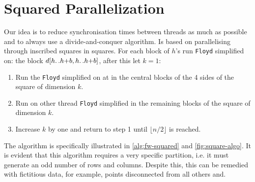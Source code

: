 \section{Squared Parallelization}\label{squared-parallelization}

Our idea is to reduce synchronisation times between threads as much as possible and to always use a divide-and-conquer algorithm. Is based on parallelising through inscribed squares in squares.
For each block of \(h\)'s run \texttt{Floyd} simplified on: the block \(d[h{\mathinner {\ldotp \ldotp}}h{+}b,h{\mathinner {\ldotp \ldotp}}h{+}b]\), after this let \(k=1\):
\begin{enumerate}
    \item Run the \texttt{Floyd} simplified on at in the central blocks of the 4 sides of the square of dimension \(k\).
    \item Run on other thread \texttt{Floyd} simplified in the remaining blocks of the square of dimension \(k\).
    \item Increase \(k\) by one and return to step 1 until \(\lfloor n/2 \rfloor\) is reached.
\end{enumerate}
The algorithm is specifically illustrated in \cref{alg:fw-squared} and \cref{fig:square-algo}.
It is evident that this algorithm requires a very specific partition, i.e. it must generate an odd number of rows and columns. Despite this, this can be remedied with fictitious data, for example, points disconnected from all others and.
